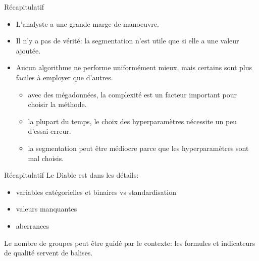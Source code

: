 \documentclass[
  ignorenonframetext,
]{beamer}
\providecommand{\tightlist}{%
  \setlength{\itemsep}{0pt}\setlength{\parskip}{0pt}}\usepackage{longtable,booktabs,array}
\begin{document}
\begin{frame}{Récapitulatif}
\protect\hypertarget{ruxe9capitulatif-1}{}
\begin{itemize}
\tightlist
\item
  L'analyste a une grande marge de manoeuvre.
\item
  Il n'y a pas de vérité: la segmentation n'est utile que si elle a une
  valeur ajoutée.
\item
  Aucun algorithme ne performe uniformément mieux, mais certains sont
  plus faciles à employer que d'autres.

  \begin{itemize}
  \tightlist
  \item
    avec des mégadonnées, la complexité est un facteur important pour
    choisir la méthode.
  \item
    la plupart du temps, le choix des hyperparamètres nécessite un peu
    d'essai-erreur.
  \item
    la segmentation peut être médiocre parce que les hyperparamètres
    sont mal choisis.
  \end{itemize}
\end{itemize}
\end{frame}

\begin{frame}{Récapitulatif}
\protect\hypertarget{ruxe9capitulatif-2}{}
Le Diable est dans les détails:

\begin{itemize}
\tightlist
\item
  variables catégorielles et binaires vs standardisation
\item
  valeurs manquantes
\item
  aberrances
\end{itemize}

Le nombre de groupes peut être guidé par le contexte: les formules et
indicateurs de qualité servent de balises.
\end{frame}
\end{document}
